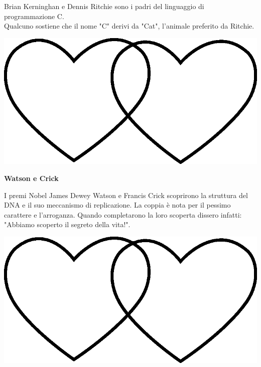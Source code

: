 \documentclass[11pt]{extarticle}
\begin{document}
\begin{center}
Brian Kerninghan e Dennis Ritchie sono i padri del linguaggio di programmazione C.\\Qualcuno sostiene che il nome "C" derivi da "Cat", l'animale preferito da Ritchie.\\
\begin{center}
\includegraphics[scale=0.1]{img/cuori_venn.eps}\\
\end{center}
\end{center}
\vspace*{\fill}
\newpage
\begin{center}
\vspace*{\fill}
{\Huge \textbf{Watson e Crick\\}}
\vspace*{\fill}
\end{center}
\newpage
{}
\vspace*{\fill}
\begin{center}
I premi Nobel James Dewey Watson e Francis Crick scoprirono la struttura del DNA e il suo meccanismo di replicazione. La coppia è nota per il pessimo carattere e l'arroganza. Quando completarono la loro scoperta dissero infatti: "Abbiamo scoperto il segreto della vita!".\\
\begin{center}
\includegraphics[scale=0.1]{img/cuori_venn.eps}\\
\end{center}
\end{center}
\end{document}
